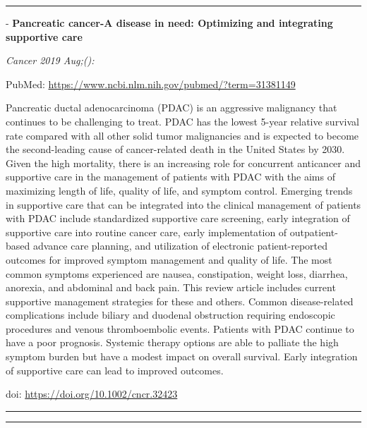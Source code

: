 \documentclass[]{article}
\begin{document}
\begin{center}\rule{0.5\linewidth}{\linethickness}\end{center}

 - \textbf{Pancreatic cancer-A disease in need: Optimizing and
integrating supportive care}

\emph{Cancer 2019 Aug;():}

PubMed: \url{https://www.ncbi.nlm.nih.gov/pubmed/?term=31381149}

Pancreatic ductal adenocarcinoma (PDAC) is an aggressive malignancy that
continues to be challenging to treat. PDAC has the lowest 5-year
relative survival rate compared with all other solid tumor malignancies
and is expected to become the second-leading cause of cancer-related
death in the United States by 2030. Given the high mortality, there is
an increasing role for concurrent anticancer and supportive care in the
management of patients with PDAC with the aims of maximizing length of
life, quality of life, and symptom control. Emerging trends in
supportive care that can be integrated into the clinical management of
patients with PDAC include standardized supportive care screening, early
integration of supportive care into routine cancer care, early
implementation of outpatient-based advance care planning, and
utilization of electronic patient-reported outcomes for improved symptom
management and quality of life. The most common symptoms experienced are
nausea, constipation, weight loss, diarrhea, anorexia, and abdominal and
back pain. This review article includes current supportive management
strategies for these and others. Common disease-related complications
include biliary and duodenal obstruction requiring endoscopic procedures
and venous thromboembolic events. Patients with PDAC continue to have a
poor prognosis. Systemic therapy options are able to palliate the high
symptom burden but have a modest impact on overall survival. Early
integration of supportive care can lead to improved outcomes.

doi: \url{https://doi.org/10.1002/cncr.32423}

{}

{}

\begin{center}\rule{0.5\linewidth}{\linethickness}\end{center}

\begin{center}\rule{0.5\linewidth}{\linethickness}\end{center}
\end{document}
